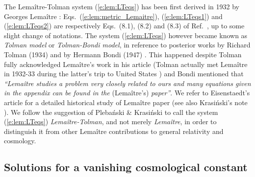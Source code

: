 \begin{hist}
The Lemaître-Tolman system (\ref{e:lem:LTeqs}) has been first derived
in 1932 by Georges Lemaître \cite{Lemai32}:
Eqs.~(\ref{e:lem:metric_Lemaitre}), (\ref{e:lem:LTeqs1}) and (\ref{e:lem:LTeqs2}) are
respectively Eqs.~(8.1), (8.2) and (8.3) of Ref.~\cite{Lemai32}, up to some slight
change of notations.
The system (\ref{e:lem:LTeqs}) however became known as \emph{Tolman model}
or \emph{Tolman-Bondi model}, in reference
to posterior works by Richard Tolman (1934) \cite{Tolma34}
and by Hermann Bondi (1947) \cite{Bondi47}.
This happened despite Tolman fully acknowledged Lemaître's work \cite{Lemai32} in his
article \cite{Tolma34} (Tolman actually met Lemaître in 1932-33 during
the latter's trip to United States \cite{Eisen93}) and Bondi \cite{Bondi47} mentioned
that \emph{``Lemaître studies a problem very closely related to ours
and many equations given in the appendix can be found in the} (Lemaître's) \emph{paper''}.
We refer to Eisenstaedt's article \cite{Eisen93} for a detailed historical
study of Lemaître paper \cite{Lemai32} (see also Krasi\'nski's note \cite{Krasi97}).
We follow the suggestion of Pleba\'nski \& Krasi\'nski \cite{PlebaK06}
to call the system (\ref{e:lem:LTeqs}) \emph{Lemaître-Tolman}, and not
merely \emph{Lemaître}, in order to distinguish it from other Lemaître contributions
to general relativity and cosmology.
\end{hist}

\subsection{Solutions for a vanishing cosmological constant} \label{s:lem:sol_lambda_zero}

